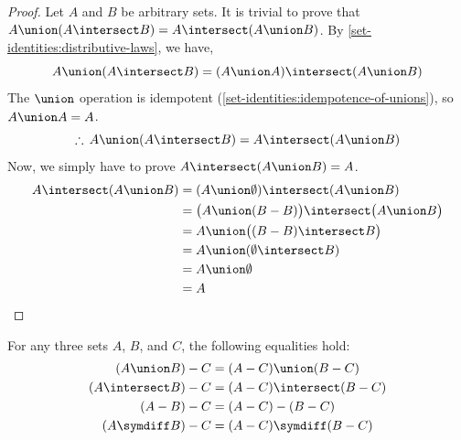 \begin{proof}
    Let \( A \) and \( B \) be arbitrary sets.
    It is trivial to prove that \( A \union \mleft( A \intersect B \mright) = A \intersect \mleft( A \union B \mright) \).
    By \cref{set-identities:distributive-laws}, we have,
    \begin{equation*}
        A \union \mleft( A \intersect B \mright) = \mleft( A \union A \mright) \intersect \mleft( A \union B \mright)
    \end{equation*}
    The \( \union  \) operation is idempotent (\cref{set-identities:idempotence-of-unions}), so \( A \union A = A \).
    \begin{equation*}
        \therefore \, A \union \mleft( A \intersect B \mright) = A \intersect \mleft( A \union B \mright)
    \end{equation*}
    Now, we simply have to prove \( A \intersect \mleft( A \union B \mright) = A \).
    \begin{align*}
        A \intersect \mleft( A \union B \mright)
        &=
        \mleft( A \union \emptyset \mright) \intersect \mleft( A \union B \mright) \\
        &=
        \big( A \union \mleft( B - B \mright) \big) \intersect \big( A \union B \big)\\
        &=
        A \union \big( \mleft( B - B \mright) \intersect B \big)\\
        &=
        A \union \mleft( \emptyset \intersect B \mright) \\
        &=
        A \union \emptyset \\
        &=
        A  \qedhere
    \end{align*}
\end{proof}

\begin{thm}
    \label{set-identities:right-distributivity-of-difference}
    For any three sets \( A \), \( B \), and \( C \), the following
    equalities hold:
    \begin{gather*}
        \mleft( A \union B \mright) - C
        =
        \mleft( A - C \mright) \union \mleft( B - C \mright) \\
        \mleft( A \intersect B \mright) - C
        =
        \mleft( A - C \mright) \intersect \mleft( B - C \mright) \\
        \mleft( A - B \mright) - C
        =
        \mleft( A - C \mright) - \mleft( B - C \mright) \\
        \mleft( A \symdiff B \mright) - C
        =
        \mleft( A - C \mright) \symdiff \mleft( B - C \mright)
    \end{gather*}
\end{thm}

